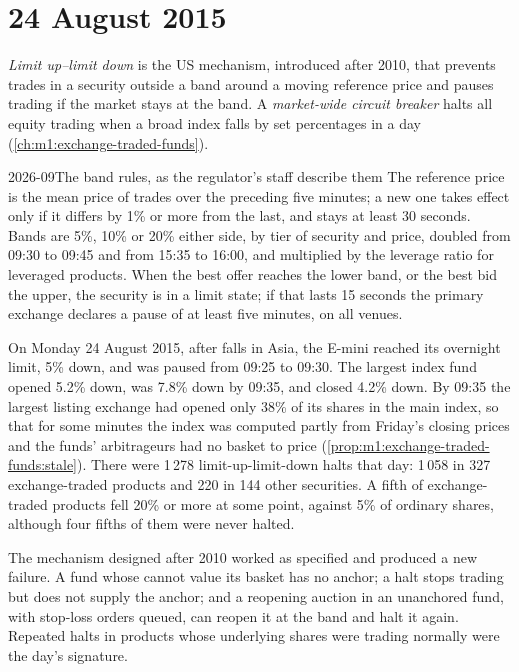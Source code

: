 \section{24 August 2015}

\begin{definition}\label{def:m1:stress-case-studies:luld}
\emph{Limit up--limit down} is the US mechanism,
introduced after 2010, that prevents trades in a security outside a band
around a moving reference price and pauses trading if the market stays at the
band. A \emph{market-wide circuit breaker}
halts all equity trading when a broad index falls by set percentages in a day
(\cref{ch:m1:exchange-traded-funds}).
\end{definition}

\begin{dated}{2026-09}{The band rules, as the regulator's staff describe them}\label{dat:m1:stress-case-studies:luld}
The reference price is the mean price of trades over the preceding five
minutes; a new one takes effect only if it differs by 1\% or more from the
last, and stays at least 30 seconds. Bands are 5\%, 10\% or 20\% either side,
by tier of security and price, doubled from 09:30 to 09:45 and from 15:35 to
16:00, and multiplied by the leverage ratio for leveraged products. When the
best offer reaches the lower band, or the best bid the upper, the security is
in a limit state; if that lasts 15 seconds the primary exchange declares a
pause of at least five minutes, on all venues.
\end{dated}

On Monday 24 August 2015, after falls in Asia, the E-mini reached its
overnight limit, 5\% down, and was paused from 09:25 to 09:30. The largest
index fund opened 5.2\% down, was 7.8\% down by 09:35, and closed 4.2\% down.
By 09:35 the largest listing exchange had opened only 38\% of its shares in
the main index, so that for some minutes the index was computed partly from
Friday's closing prices and the funds' arbitrageurs had
no basket to price (\cref{prop:m1:exchange-traded-funds:stale}). There were
1\,278 limit-up-limit-down halts that day: 1\,058 in 327 exchange-traded
products and 220 in 144 other securities. A fifth of exchange-traded
products fell 20\% or more at some point, against 5\% of ordinary shares,
although four fifths of them were never halted.

The mechanism designed after 2010 worked as specified and produced a new
failure. A fund whose  cannot value its basket has no anchor; a
halt stops trading but does not supply the anchor; and a reopening auction in
an unanchored fund, with stop-loss orders queued, can reopen it at the band
and halt it again. Repeated halts in products whose underlying shares were
trading normally were the day's signature.

